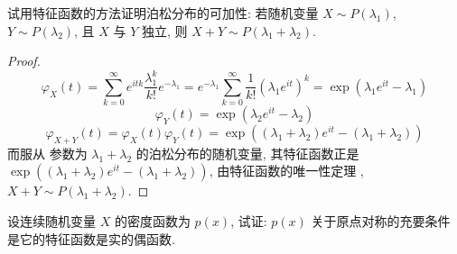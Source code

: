 \documentclass[../main.tex]{subfiles}
\begin{document}
\begin{exercise}{}{}
试用特征函数的方法证明泊松分布的可加性: 若随机变量 $X \sim P(\lambda_1)$, $Y \sim P(\lambda_2)$, 且 $X$ 与 $Y$ 独立, 则 $X+Y \sim P(\lambda_1+\lambda_2)$.
\end{exercise}

\begin{proof}
     \[
      \varphi _{X}\left( t \right)= \sum _{k= 0}^{\infty}e^{itk}\frac{ \lambda _1 ^{k} }{k! }e^{- \lambda _1 }  = e^{- \lambda_1 }\sum _{k= 0}^{\infty}\frac{1 }{k! } \left(  \lambda _1 e^{it} \right)^{k}= \exp \left(  \lambda _1 e^{it}- \lambda _1  \right)   
     \] \[
      \varphi _{Y}\left( t \right)= \exp \left(  \lambda _2 e^{it}- \lambda _2  \right)  
     \] \[
      \varphi _{X+ Y}\left( t \right)=  \varphi _{X}\left( t \right) \varphi _{Y}\left( t \right)= \exp \left( \left(  \lambda _1 +  \lambda _2  \right)e^{it}-\left(  \lambda _1 +  \lambda _2  \right)   \right)    
     \]而服从 参数为 \(   \lambda _1 +  \lambda _2   \) 的泊松分布的随机变量, 其特征函数正是 \(  \exp \left( \left(  \lambda _1 +  \lambda _2  \right)e^{it}-\left(  \lambda _1 +  \lambda _2  \right)   \right)   \), 由特征函数的唯一性定理 , \(  X+ Y\sim P\left(  \lambda _1 +  \lambda _2  \right)   \).  
\end{proof}


\begin{exercise}{}{}
设连续随机变量 $X$ 的密度函数为 $p(x)$, 试证: $p(x)$ 关于原点对称的充要条件是它的特征函数是实的偶函数.
\end{exercise}
\end{document}
